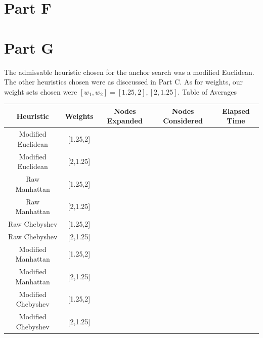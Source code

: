 \documentclass[12pt]{article}
\begin{document}
\section{Part F}


\section{Part G}
The admissable heuristic chosen for the anchor search was a modified Euclidean. The other heuristics chosen were as disccussed in Part C. As for weights, our weight sets chosen were \([w_1,w_2] = [1.25,2],[2,1.25]\).
\newline
\newline
Table of Averages
\newline
\begin{tabular}{|c|c|c|c|c|}
\hline
	Heuristic & Weights & Nodes Expanded & Nodes Considered & Elapsed Time\\
\hline
	Modified Euclidean & [1.25,2] &  &  & \\
\hline
	Modified Euclidean & [2,1.25] &  &  & \\
\hline
	Raw Manhattan & [1.25,2] &  &  & \\
\hline
	Raw Manhattan & [2,1.25] &  &  & \\
\hline
	Raw Chebyshev & [1.25,2] &  &  & \\
\hline
	Raw Chebyshev & [2,1.25] &  &  & \\
\hline
	Modified Manhattan & [1.25,2] &  &  & \\
\hline
	Modified Manhattan & [2,1.25] &  &  & \\
\hline
	Modified Chebyshev & [1.25,2] &  &  & \\
\hline
	Modified Chebyshev & [2,1.25] &  &  & \\
\hline
\end{tabular}
\end{document}
